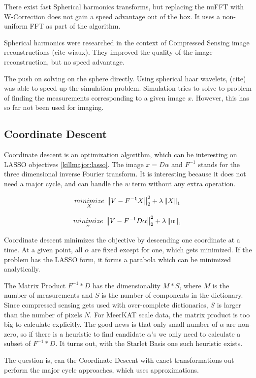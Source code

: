 There exist fast Spherical harmonics transforms, but replacing the nuFFT with W-Correction does not gain a speed advantage out of the box. It uses a non-uniform FFT as part of the algorithm.

Spherical harmonics were researched in the context of Compressed Sensing image reconstructions (cite wiaux). They improved the quality of the image reconstruction, but no speed advantage.

The push on solving on the sphere directly. Using spherical haar wavelets, (cite) was able to speed up the simulation problem. Simulation tries to solve to problem of finding the measurements corresponding to a given image $x$. However, this has so far not been used for imaging.


\subsection{Coordinate Descent}
Coordinate descent is an optimization algorithm, which can be interesting on LASSO objectives \eqref{killmajor:lasso}. The image $x = D\alpha$ and $F^{-1}$ stands for the three dimensional inverse Fourier transform. It is interesting because it does not need a major cycle, and can handle the $w$ term without any extra operation.


\begin{equation}\label{killmajor:lasso}
\underset{X}{minimize} \: \left \| V - F^{-1}X \right \|_2^2 + \lambda \left \| X \right \|_1 \\
\end{equation}

\begin{equation}
\underset{\alpha}{minimize} \: \left \| V - F^{-1}D \alpha \right \|_2^2 + \lambda \left \| \alpha \right \|_1 \\
\end{equation}

Coordinate descent minimizes the objective by descending one coordinate at a time. At a given point, all $\alpha$ are fixed except for one, which gets minimized. If the problem has the LASSO form, it forms a parabola which can be minimized analytically.

The Matrix Product $F^{-1}*D$ has the dimensionality $M*S$, where $M$ is the number of measurements and $S$ is the number of components in the dictionary. Since compressed sensing gets used with over-complete dictionaries, $S$ is larger than the number of pixels $N$. For MeerKAT scale data, the matrix product is too big to calculate explicitly.  The good news is that only small number of $\alpha$ are non-zero, so if there is a heuristic to find candidate $\alpha$'s we only need to calculate a subset of $F^{-1}*D$. It turns out, with the Starlet Basis one such heuristic exists.

The question is, can the Coordinate Descent with exact transformations out-perform the major cycle approaches, which uses approximations.


